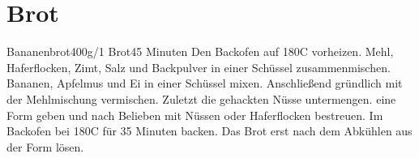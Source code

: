 \documentclass[twoside=true, DIV=16, 11pt,a4paper]{scrreprt}
\begin{document}
	\chapter{Brot}
	\begin{recipe}{Bananenbrot}{400g/1 Brot}{45 Minuten}
		Den Backofen auf 180\0C vorheizen.
		Mehl, Haferflocken, Zimt, Salz und Backpulver in einer Schüssel zusammenmischen.
		Bananen, Apfelmus und Ei in einer Schüssel mixen. Anschließend gründlich mit der Mehlmischung vermischen.
		Zuletzt die gehackten Nüsse untermengen.
		\newstep eine Form geben und nach Belieben mit Nüssen oder Haferflocken bestreuen. Im Backofen bei 180\0C für 35 Minuten backen.
		\newstep
		Das Brot erst nach dem Abkühlen aus der Form lösen.
	\end{recipe}
\end{document}

